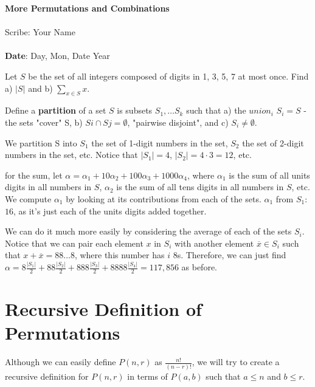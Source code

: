 \documentclass[11pt,twosided]{article}
\def\titlestring{More Permutations and Combinations}
\def\scribestring{Your Name}
\def\datestring{Day, Mon, Date Year}
\begin{document}
\thispagestyle{plain}  %

\noindent
{\LARGE \textbf{\titlestring}}\\\\
%
{\Large Scribe: \scribestring}\\ \\
{\textbf{Date}: \datestring}


\noindent

\begin{problem}{1}
Let $S$ be the set of all integers composed of digits in {1, 3, 5, 7} at most once. 
Find a) $|S|$ and b) $\sum_{x \in S} x$. 
\end{problem}


Define a \textbf{partition} of a set $S$ is subsets $S_1, \ldots S_k$ such that a) the $union_i$ $S_i = S$ - the sets "cover" S, b) $Si \cap Sj = \emptyset$, "pairwise disjoint", and c) $S_i \neq \emptyset$. 

We partition S into $S_1$ the set of 1-digit numbers in the set, $S_2$ the set of 2-digit numbers in the set, etc. Notice that $|S_1| = 4$, $|S_2| = 4 \cdot 3 = 12$, etc. 

for the sum, let $\alpha = \alpha_1 + 10 \alpha_2 + 100 \alpha_3 + 1000 \alpha_4$, where $\alpha_1$ is the sum of all units digits in all numbers in $S$, $\alpha_2$ is the sum of all tens digits in all numbers in $S$, etc. 
We compute $\alpha_1$ by looking at its contributions from each of the sets. 
$\alpha_1$ from $S_1$: $16$, as it's just each of the units digits added together. 

We can do it much more easily by considering the average of each of the sets $S_i$. Notice that we can pair each element $x$ in $S_i$ with another element $\overline{x} \in S_i$ such that $x + \overline{x} = 88\ldots 8$, where this number has $i$ 8s. Therefore, we can just find $\alpha = 8 \frac{|S_1|}{2} + 88 \frac{|S_2|}{2} + 888 \frac{|S_3|}{2} + 8888 \frac{|S_4|}{2} = 117,856$ as before. 

\section{Recursive Definition of Permutations}
Although we can easily define $P(n, r)$ as $\frac{n!}{(n-r)!}$, we will try to create a recursive definition for $P(n,r)$ in terms of $P(a, b)$ such that $a \leq n$ and $b \leq r$. 
\end{document}
